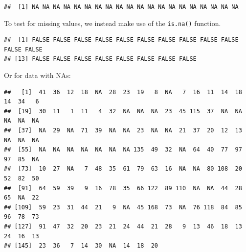 \documentclass[
]{book}
\newenvironment{Shaded}{\begin{snugshade}}{\end{snugshade}}
\newcommand{\FunctionTok}[1]{\textcolor[rgb]{0.13,0.29,0.53}{\textbf{#1}}}
\newcommand{\NormalTok}[1]{#1}
\newcommand{\SpecialCharTok}[1]{\textcolor[rgb]{0.81,0.36,0.00}{\textbf{#1}}}
\begin{document}
\begin{verbatim}
##  [1] NA NA NA NA NA NA NA NA NA NA NA NA NA NA NA NA NA NA NA NA
\end{verbatim}

To test for missing values, we instead make use of the \texttt{is.na()} function.

\begin{Shaded}
\end{Shaded}

\begin{verbatim}
##  [1] FALSE FALSE FALSE FALSE FALSE FALSE FALSE FALSE FALSE FALSE FALSE FALSE
## [13] FALSE FALSE FALSE FALSE FALSE FALSE FALSE FALSE
\end{verbatim}

Or for data with NAs:

\begin{Shaded}
\end{Shaded}

\begin{verbatim}
##   [1]  41  36  12  18  NA  28  23  19   8  NA   7  16  11  14  18  14  34   6
##  [19]  30  11   1  11   4  32  NA  NA  NA  23  45 115  37  NA  NA  NA  NA  NA
##  [37]  NA  29  NA  71  39  NA  NA  23  NA  NA  21  37  20  12  13  NA  NA  NA
##  [55]  NA  NA  NA  NA  NA  NA  NA 135  49  32  NA  64  40  77  97  97  85  NA
##  [73]  10  27  NA   7  48  35  61  79  63  16  NA  NA  80 108  20  52  82  50
##  [91]  64  59  39   9  16  78  35  66 122  89 110  NA  NA  44  28  65  NA  22
## [109]  59  23  31  44  21   9  NA  45 168  73  NA  76 118  84  85  96  78  73
## [127]  91  47  32  20  23  21  24  44  21  28   9  13  46  18  13  24  16  13
## [145]  23  36   7  14  30  NA  14  18  20
\end{verbatim}

\begin{Shaded}
\end{Shaded}
\end{document}
